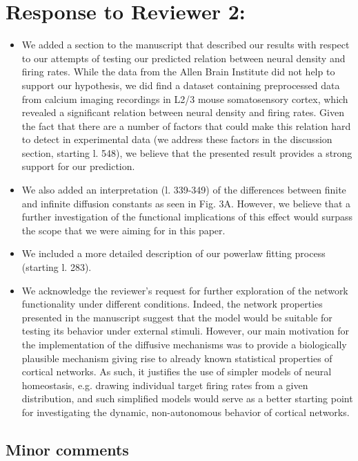 \documentclass[10pt,a4paper]{article}
\begin{document}
\section{Response to Reviewer 2:}
\begin{itemize}
\item We added a section to the manuscript that described our results with respect to our attempts of testing our predicted relation between neural density and firing rates. While the data from the Allen Brain Institute did not help to support our hypothesis, we did find a dataset containing preprocessed data from calcium imaging recordings in L2/3 mouse somatosensory cortex, which revealed a significant relation between neural density and firing rates. Given the fact that there are a number of factors that could make this relation hard to detect in experimental data (we address these factors in the discussion section, starting l. 548), we believe that the presented result provides a strong support for our prediction.

\item We also added an interpretation (l. 339-349) of the differences between finite and infinite diffusion constants as seen in Fig. 3A. However, we believe that a further investigation of the functional implications of this effect would surpass the scope that we were aiming for in this paper.

\item We included a more detailed description of our powerlaw fitting process (starting l. 283).

\item We acknowledge the reviewer's request for further exploration of the network functionality under different conditions. Indeed, the network properties presented in the manuscript suggest that the model would be suitable for testing its behavior under external stimuli. However, our main motivation for the implementation of the diffusive mechanisms was to provide a biologically plausible mechanism giving rise to already known statistical properties of cortical networks. As such, it justifies the use of simpler models of neural homeostasis, e.g. drawing individual target firing rates from a given distribution, and such simplified models would serve as a better starting point for investigating the dynamic, non-autonomous behavior of cortical networks.
\end{itemize}

\subsection{Minor comments}
\end{document}
